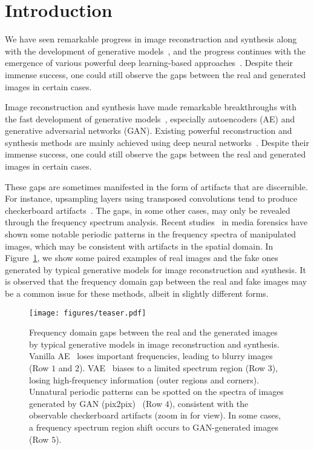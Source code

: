 \documentclass[10pt,twocolumn,letterpaper]{article}
\begin{document}
\section{Introduction}
\label{sec:introduction}

We have seen remarkable progress in image reconstruction and synthesis along with the development of generative models~\cite{ae,vae,GAN,glow,pixelcnn}, and the progress continues with the emergence of various powerful deep learning-based approaches~\cite{stylegan2,SPADE,alae,nvae}. 
Despite their immense success, one could still observe the gaps between the real and generated images in certain cases.




Image reconstruction and synthesis have made remarkable breakthroughs with the fast development of generative models~\cite{ae,vae,GAN,glow,pixelcnn}, especially autoencoders (AE) and generative adversarial networks (GAN).
Existing powerful reconstruction and synthesis methods are mainly achieved using deep neural networks~\cite{stylegan2,SPADE,alae,nvae}.
Despite their immense success, one could still observe the gaps between the real and generated images in certain cases.
\fi




These gaps are sometimes manifested in the form of artifacts that are discernible. 
For instance, upsampling layers using transposed convolutions tend to produce checkerboard artifacts~\cite{checkerboardarti}. The gaps, in some other cases, may only be revealed through the frequency spectrum analysis. Recent studies~\cite{cnndetection,artifactsganfake,fakeretouch} in media forensics have shown some notable periodic patterns in the frequency spectra of manipulated images, which may be consistent with artifacts in the spatial domain.
In Figure~\ref{fig:teaser}, we show some paired examples of real images and the fake ones generated by typical generative models for image reconstruction and synthesis.
It is observed that the frequency domain gap between the real and fake images may be a common issue for these methods, albeit in slightly different forms.



\begin{figure}[t]
	\centering
\texttt{[image: figures/teaser.pdf]}
\caption{Frequency domain gaps between the real and the generated images by typical generative models in image reconstruction and synthesis. Vanilla AE~\cite{ae} loses important frequencies, leading to blurry images (Row $1$ and $2$). VAE~\cite{vae} biases to a limited spectrum region (Row $3$), losing high-frequency information (outer regions and corners). Unnatural periodic patterns can be spotted on the spectra of images generated by GAN (pix2pix)~\cite{pix2pix} (Row $4$), consistent with the observable checkerboard artifacts (zoom in for view). In some cases, a frequency spectrum region shift occurs to GAN-generated images (Row $5$).}
	\label{fig:teaser}
	\vspace{-0.4cm}
\end{figure}
\end{document}
